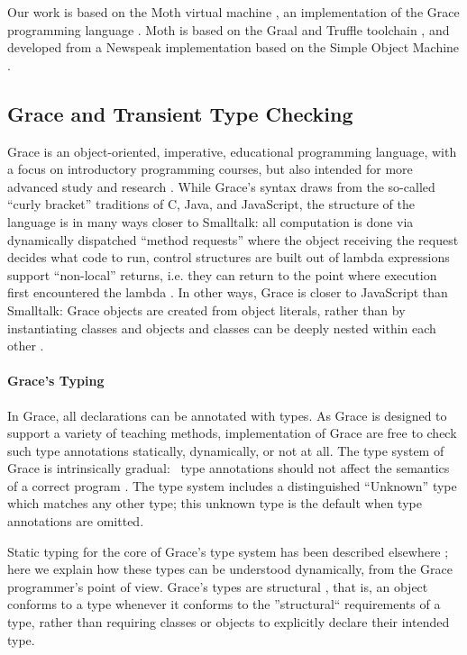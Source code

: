 \documentclass[sigplan,screen]{acmart}
\begin{document}
Our work is based on the Moth virtual machine 
\cite{Roberts2017,roberts-and-co-ecoop-2019},
an implementation
of the Grace programming language 
\citep{graceOnward12,graceSigcse13}.
Moth is based on the Graal and Truffle toolchain
\cite{Wurthinger:2017:PPE,Wurthinger2013},
and developed from a Newspeak implementation based on the  Simple
Object Machine \cite{Daloze2016,SOMns}.

\subsection{Grace and Transient Type Checking}

Grace is an object-oriented, imperative, educational programming
language, with a focus on introductory programming
courses, but also intended for more advanced study and research \citep{graceOnward12,graceSigcse13}.
%
While Grace's syntax draws
from the so-called ``curly bracket'' traditions of C, Java, and
JavaScript, the structure of the language
is in many ways closer to Smalltalk:
all computation is done via dynamically dispatched  ``method requests''
where the object receiving the request decides what code to run,
control structures are built out of lambda expressions support ``non-local'' returns, i.e. they can return to the point where execution first encountered the lambda \citep{bluebook}.  In
other ways, Grace is closer to JavaScript than Smalltalk: Grace
objects are created from object literals, rather than by
instantiating classes \citep{Black2007-emeraldHOPL,JonesECOOP2016} and
objects and classes can be deeply nested within each 
other \citep{betabook}.

\paragraph{Grace's Typing}
In Grace, all declarations can be annotated with types.
As Grace is designed to support a variety of teaching methods, implementation of Grace are free to check such type annotations  statically, dynamically, or not at all.
The type system of Grace is intrinsically gradual:%
%
~type annotations should not affect the semantics of a correct
program \citep{XXXSiek2015}. The type system
includes a distinguished ``{Unknown}'' type which matches any other type; this unknown type is the default when type annotations are omitted.

Static typing for the core of Grace's type system has been described
elsewhere \citep{TimJonesThesis};
here we explain how
these types can be understood 
dynamically, from the Grace programmer's point of view.
Grace's types are structural \citep{graceOnward12},
that is, an object conforms to a type whenever it conforms to the ''structural`` requirements of a type,
rather than requiring classes or objects to explicitly declare their intended type.
\end{document}
